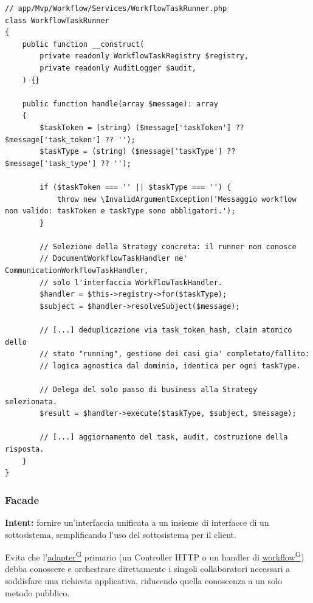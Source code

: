 \documentclass[a4paper,12pt]{article}
\providecommand{\glslink}[2]{\href{https://alittlebyte-19.github.io/Documentazione/glossario.html\#gls-#1}{\underline{#2}\textsuperscript{\scriptsize G}}}
\begin{document}
\begin{sloppypar}
\begin{lstlisting}[style=phplisting, caption={WorkflowTaskRunner: selezione della Strategy concreta e delega del passo di business}]
// app/Mvp/Workflow/Services/WorkflowTaskRunner.php
class WorkflowTaskRunner
{
    public function __construct(
        private readonly WorkflowTaskRegistry $registry,
        private readonly AuditLogger $audit,
    ) {}

    public function handle(array $message): array
    {
        $taskToken = (string) ($message['taskToken'] ?? $message['task_token'] ?? '');
        $taskType = (string) ($message['taskType'] ?? $message['task_type'] ?? '');

        if ($taskToken === '' || $taskType === '') {
            throw new \InvalidArgumentException('Messaggio workflow non valido: taskToken e taskType sono obbligatori.');
        }

        // Selezione della Strategy concreta: il runner non conosce
        // DocumentWorkflowTaskHandler ne' CommunicationWorkflowTaskHandler,
        // solo l'interfaccia WorkflowTaskHandler.
        $handler = $this->registry->for($taskType);
        $subject = $handler->resolveSubject($message);

        // [...] deduplicazione via task_token_hash, claim atomico dello
        // stato "running", gestione dei casi gia' completato/fallito:
        // logica agnostica dal dominio, identica per ogni taskType.

        // Delega del solo passo di business alla Strategy selezionata.
        $result = $handler->execute($taskType, $subject, $message);

        // [...] aggiornamento del task, audit, costruzione della risposta.
    }
}
\end{lstlisting}

\subsubsection{Facade}

\textbf{Intent:} fornire un'interfaccia unificata a un insieme di interfacce di un sottosistema, semplificando l'uso del sottosistema per il client.

Evita che l'\glslink{adapter}{adapter} primario (un Controller HTTP o un handler di \glslink{workflow}{workflow}) debba conoscere e orchestrare direttamente i singoli collaboratori necessari a soddisfare una richiesta applicativa, riducendo quella conoscenza a un solo metodo pubblico.


\end{sloppypar}
\end{document}
